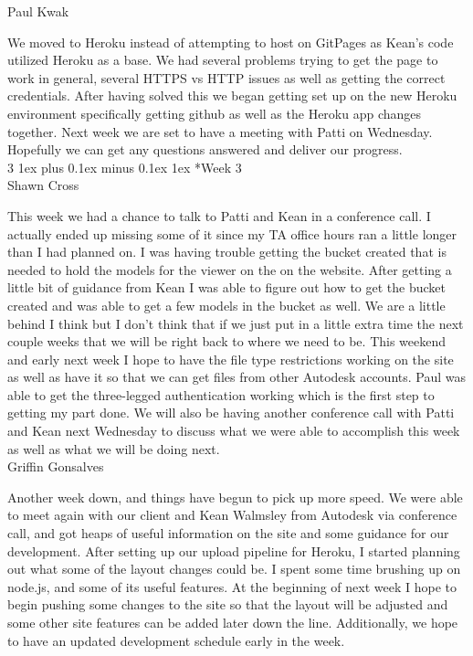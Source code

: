\documentclass[letterpaper, 10pt, draftclsnofoot, compsoc, onecolumn]{IEEEtran}
\makeatletter
\def\subsubsection{\@startsection{subsubsection}%
                                 {3}%
                                 {\z@}%
                                 {1ex plus 0.1ex minus 0.1ex}%
                                 {1ex}%
                                 {\normalfont\normalsize}}%
\makeatother
\begin{document}
Paul Kwak

We moved to Heroku instead of attempting to host on GitPages as Kean's code utilized Heroku as a base. We had several problems trying to get the page to work in general, several HTTPS vs HTTP issues as well as getting the correct credentials. After having solved this we began getting set up on the new Heroku environment specifically getting github as well as the Heroku app changes together. Next week we are set to have a meeting with Patti on Wednesday. Hopefully we can get any questions answered and deliver our progress.\\

\subsubsection*{Week 3}\hspace*{\fill} \\
Shawn Cross

This week we had a chance to talk to Patti and Kean in a conference call. I actually ended up missing some of it since my TA office hours ran a little longer than I had planned on. I was having trouble getting the bucket created that is needed to hold the models for the viewer on the on the website. After getting a little bit of guidance from Kean I was able to figure out how to get the bucket created and was able to get a few models in the bucket as well. We are a little behind I think but I don't think that if we just put in a little extra time the next couple weeks that we will be right back to where we need to be. This weekend and early next week I hope to have the file type restrictions working on the site as well as have it so that we can get files from other Autodesk accounts. Paul was able to get the three-legged authentication working which is the first step to getting my part done. We will also be having another conference call with Patti and Kean next Wednesday to discuss what we were able to accomplish this week as well as what we will be doing next.\\

Griffin Gonsalves

Another week down, and things have begun to pick up more speed. We were able to meet again with our client and Kean Walmsley from Autodesk via conference call, and got heaps of useful information on the site and some guidance for our development. After setting up our upload pipeline for Heroku, I started planning out what some of the layout changes could be. I spent some time brushing up on node.js, and some of its useful features. At the beginning of next week I hope to begin pushing some changes to the site so that the layout will be adjusted and some other site features can be added later down the line. Additionally, we hope to have an updated development schedule early in the week.\\
\end{document}

